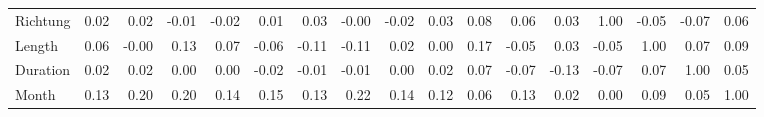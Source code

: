 \begin{tabular}{lrrrrrrrrrrrrrrrr}
Richtung &  0.02 &  0.02 & -0.01 & -0.02 &   0.01 &   0.03 & -0.00 &  -0.02 &   0.03 & 0.08 &  0.06 &    0.03 &      1.00 &   -0.05 &     -0.07 &   0.06 \\
Length   &  0.06 & -0.00 &  0.13 &  0.07 &  -0.06 &  -0.11 & -0.11 &   0.02 &   0.00 & 0.17 & -0.05 &    0.03 &     -0.05 &    1.00 &      0.07 &   0.09 \\
Duration &  0.02 &  0.02 &  0.00 &  0.00 &  -0.02 &  -0.01 & -0.01 &   0.00 &   0.02 & 0.07 & -0.07 &   -0.13 &     -0.07 &    0.07 &      1.00 &   0.05 \\
Month    &  0.13 &  0.20 &  0.20 &  0.14 &   0.15 &   0.13 &  0.22 &   0.14 &   0.12 & 0.06 &  0.13 &    0.02 &      0.00 &    0.09 &      0.05 &   1.00 \\
\bottomrule
\end{tabular}
